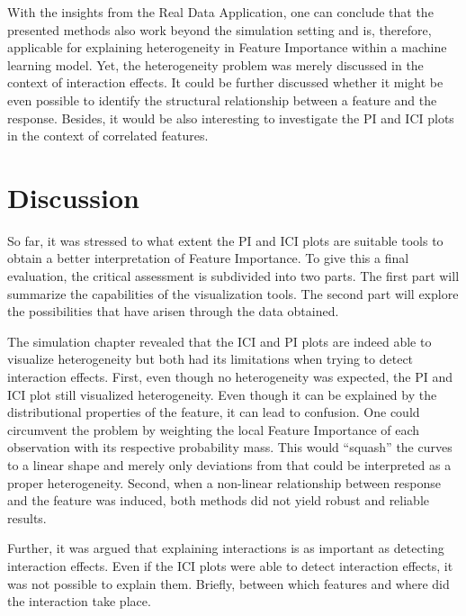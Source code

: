 \documentclass[]{krantz}
\begin{document}
With the insights from the Real Data Application, one can conclude that
the presented methods also work beyond the simulation setting and is,
therefore, applicable for explaining heterogeneity in Feature Importance
within a machine learning model. Yet, the heterogeneity problem was
merely discussed in the context of interaction effects. It could be
further discussed whether it might be even possible to identify the
structural relationship between a feature and the response. Besides, it
would be also interesting to investigate the PI and ICI plots in the
context of correlated features.

\pagebreak

\section{Discussion}\label{ch5}

So far, it was stressed to what extent the PI and ICI plots are suitable
tools to obtain a better interpretation of Feature Importance. To give
this a final evaluation, the critical assessment is subdivided into two
parts. The first part will summarize the capabilities of the
visualization tools. The second part will explore the possibilities that
have arisen through the data obtained.

The simulation chapter revealed that the ICI and PI plots are indeed
able to visualize heterogeneity but both had its limitations when trying
to detect interaction effects. First, even though no heterogeneity was
expected, the PI and ICI plot still visualized heterogeneity. Even
though it can be explained by the distributional properties of the
feature, it can lead to confusion. One could circumvent the problem by
weighting the local Feature Importance of each observation with its
respective probability mass. This would ``squash'' the curves to a
linear shape and merely only deviations from that could be interpreted
as a proper heterogeneity. Second, when a non-linear relationship
between response and the feature was induced, both methods did not yield
robust and reliable results.

Further, it was argued that explaining interactions is as important as
detecting interaction effects. Even if the ICI plots were able to detect
interaction effects, it was not possible to explain them. Briefly,
between which features and where did the interaction take place.
\end{document}
